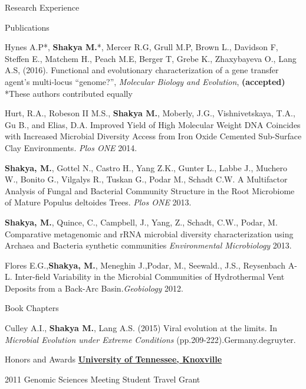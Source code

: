 \documentclass{resume} %
\begin{document}
\begin{rSection}{Research Experience}
\begin{rSection}{Publications}
\item Hynes A.P*, \textbf{Shakya M.}*, Mercer R.G, Grull M.P, Brown L., Davidson F, Steffen E., Matchem H., Peach M.E, Berger T, Grebe K., Zhaxybayeva O., Lang A.S, (2016). Functional and evolutionary characterization of a gene transfer agent's multi-locus ``genome?'', \textit{Molecular Biology and Evolution}, \textbf{(accepted)} *{\tiny These authors contributed equally}
\item Hurt, R.A., Robeson II M.S., \textbf{Shakya M.}, Moberly, J.G., Vishnivetskaya, T.A., Gu B., and Elias, D.A. Improved Yield of High Molecular Weight DNA Coincides with Increased Microbial Diversity Access from Iron Oxide Cemented Sub-Surface Clay Environments. \textit{Plos ONE} 2014.
 \item \textbf{Shakya, M.}, Gottel N., Castro H., Yang Z.K., Gunter L., Labbe J., Muchero W., Bonito G., Vilgalys R., Tuskan G., Podar M., Schadt C.W. A Multifactor Analysis of Fungal and Bacterial Community Structure in the Root Microbiome of Mature Populus deltoides Trees. \textit{Plos ONE} 2013. 
\item \textbf{Shakya, M.}, Quince, C., Campbell, J., Yang, Z., Schadt, C.W., Podar, M. Comparative metagenomic and rRNA microbial diversity characterization using Archaea and Bacteria synthetic communities \textit{Environmental Microbiology} 2013.
\item Flores E.G.,\textbf{Shakya, M.}, Meneghin J.,Podar, M., Seewald., J.S., Reysenbach A-L. Inter-field Variability in the Microbial Communities of Hydrothermal Vent Deposits from a Back-Arc Basin.\textit{Geobiology} 2012. 
\end{rSection}


\begin{rSection}{Book Chapters}
\item Culley A.I., \textbf{Shakya M.}, Lang A.S. (2015) Viral evolution at the limits. In \textit{Microbial Evolution under Extreme Conditions} (pp.209-222).Germany.degruyter.
\end{rSection}


\begin{rSection}{Honors and Awards}
\href{http://www.utk.edu}{\textbf{University of Tennessee, Knoxville}}
\item 2011 Genomic Sciences Meeting Student Travel Grant


\end{rSection}
\end{rSection}
\end{document}
